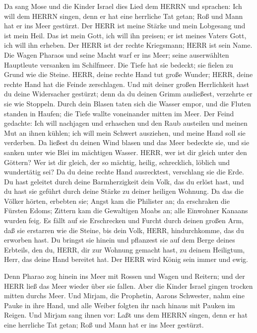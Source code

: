  Da sang Mose und die Kinder Israel dies Lied dem HERRN und
sprachen: Ich will dem HERRN singen, denn er hat eine herrliche Tat
getan; Roß und Mann hat er ins Meer gestürzt.  Der HERR ist
meine Stärke und mein Lobgesang und ist mein Heil. Das ist mein Gott,
ich will ihn preisen; er ist meines Vaters Gott, ich will ihn erheben.
 Der HERR ist der rechte Kriegsmann; HERR ist sein Name.
 Die Wagen Pharaos und seine Macht warf er ins Meer; seine
auserwählten Hauptleute versanken im Schilfmeer.  Die Tiefe
hat sie bedeckt; sie fielen zu Grund wie die Steine.  HERR,
deine rechte Hand tut große Wunder; HERR, deine rechte Hand hat die
Feinde zerschlagen.  Und mit deiner großen Herrlichkeit hast
du deine Widersacher gestürzt; denn da du deinen Grimm ausließest,
verzehrte er sie wie Stoppeln.  Durch dein Blasen taten sich
die Wasser empor, und die Fluten standen in Haufen; die Tiefe wallte
voneinander mitten im Meer.  Der Feind gedachte: Ich will
nachjagen und erhaschen und den Raub austeilen und meinen Mut an ihnen
kühlen; ich will mein Schwert ausziehen, und meine Hand soll sie
verderben.  Da ließest du deinen Wind blasen und das Meer
bedeckte sie, und sie sanken unter wie Blei im mächtigen Wasser.
 HERR, wer ist dir gleich unter den Göttern? Wer ist dir
gleich, der so mächtig, heilig, schrecklich, löblich und wundertätig
sei?  Da du deine rechte Hand ausrecktest, verschlang sie
die Erde.  Du hast geleitet durch deine Barmherzigkeit dein
Volk, das du erlöst hast, und du hast sie geführt durch deine Stärke zu
deiner heiligen Wohnung.  Da das die Völker hörten,
erbebten sie; Angst kam die Philister an;  da erschraken
die Fürsten Edoms; Zittern kam die Gewaltigen Moabs an; alle Einwohner
Kanaans wurden feig.  Es fällt auf sie Erschrecken und
Furcht durch deinen großen Arm, daß sie erstarren wie die Steine, bis
dein Volk, HERR, hindurchkomme, das du erworben hast.  Du
bringst sie hinein und pflanzest sie auf dem Berge deines Erbteils, den
du, HERR, dir zur Wohnung gemacht hast, zu deinem Heiligtum, Herr, das
deine Hand bereitet hat.  Der HERR wird König sein immer
und ewig.

 Denn Pharao zog hinein ins Meer mit Rossen und Wagen und
Reitern; und der HERR ließ das Meer wieder über sie fallen. Aber die
Kinder Israel gingen trocken mitten durchs Meer.  Und
Mirjam, die Prophetin, Aarons Schwester, nahm eine Pauke in ihre Hand,
und alle Weiber folgten ihr nach hinaus mit Pauken im Reigen.
 Und Mirjam sang ihnen vor: Laßt uns dem HERRN singen, denn
er hat eine herrliche Tat getan; Roß und Mann hat er ins Meer gestürzt.


